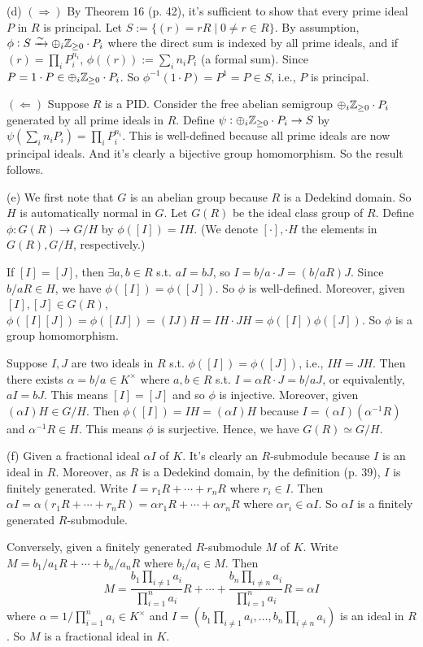 \documentclass[../Marcus.tex]{subfiles}
\begin{document}
(d) $(\Rightarrow)$ By Theorem 16 (p. 42), it's sufficient to show that every prime ideal $P$ in $R$ is principal. Let $S:=\{(r)=rR\mid 0\neq r\in R\}$. By assumption, $\phi:S\xrightarrow{\sim} \oplus_i \mathbb{Z}_{\geq0} \cdot P_i$ where the direct sum is indexed by all prime ideals, and if $(r)=\prod_i P_i^{n_i}$, $\phi((r)):=\sum_i n_iP_i$ (a formal sum). Since $P=1\cdot P\in \oplus_{i} \mathbb{Z}_{\geq0} \cdot P_i$. So $\phi^{-1}(1\cdot P)=P^1=P\in S$, i.e., $P$ is principal.

$(\Leftarrow)$ Suppose $R$ is a PID. Consider the free abelian semigroup $\oplus_{i} \mathbb{Z}_{\geq0}\cdot P_i$ generated by all prime ideals in $R$. Define $\psi:\oplus_{i} \mathbb{Z}_{\geq0}\cdot P_i \to S$ by $\psi(\sum_i n_iP_i)=\prod_i P_i^{n_i}$. This is well-defined because all prime ideals are now principal ideals. And it's clearly a bijective group homomorphism. So the result follows.

(e) We first note that $G$ is an abelian group because $R$ is a Dedekind domain. So $H$ is automatically normal in $G$. Let $G(R)$ be the ideal class group of $R$. Define $\phi:G(R)\to G/H$ by $\phi([I])=IH$. (We denote $[\cdot],\cdot H$ the elements in $G(R),G/H$, respectively.)

If $[I]=[J]$, then $\exists a,b\in R$ s.t. $aI=bJ$, so $I=b/a\cdot J = (b/aR)J$. Since $b/aR\in H$, we have $\phi([I])=\phi([J])$. So $\phi$ is well-defined. Moreover, given $[I],[J]\in G(R)$, $\phi([I][J])=\phi([IJ])=(IJ)H=IH\cdot JH=\phi([I])\phi([J])$. So $\phi$ is a group homomorphism.

Suppose $I,J$ are two ideals in $R$ s.t. $\phi([I])=\phi([J])$, i.e., $IH=JH$. Then there exists $\alpha=b/a\in K^\times$ where $a,b\in R$ s.t. $I=\alpha R\cdot J = b/a J$, or equivalently, $aI=bJ$. This means $[I]=[J]$ and so $\phi$ is injective. Moreover, given $(\alpha I)H\in G/H$. Then $\phi([I])=IH=(\alpha I)H$ because $I=(\alpha I)(\alpha^{-1}R)$ and $\alpha^{-1}R\in H$. This means $\phi$ is surjective. Hence, we have $G(R)\simeq G/H$.

(f) Given a fractional ideal $\alpha I$ of $K$. It's clearly an $R$-submodule because $I$ is an ideal in $R$. Moreover, as $R$ is a Dedekind domain, by the definition (p. 39), $I$ is finitely generated. Write $I=r_1R+\cdots+r_nR$ where $r_i\in I$. Then $\alpha I=\alpha(r_1R+\cdots+r_nR)=\alpha r_1R+\cdots+\alpha r_nR$ where $\alpha r_i\in\alpha I$. So $\alpha I$ is a finitely generated $R$-submodule. 

Conversely, given a finitely generated $R$-submodule $M$ of $K$. Write $M=b_1/a_1R+\cdots+b_n/a_nR$ where $b_i/a_i\in M$. Then $$M=\frac{b_1 \prod_{i\neq1} a_i}{\prod_{i=1}^n a_i}R+\cdots+\frac{b_n \prod_{i\neq n} a_i}{\prod_{i=1}^n a_i}R=\alpha I$$ where $\alpha=1/\prod_{i=1}^n a_i\in K^\times$ and $I=(b_1 \prod_{i\neq1} a_i,\ldots,b_n \prod_{i\neq n} a_i)$ is an ideal in $R$. So $M$ is a fractional ideal in $K$.
\end{document}

